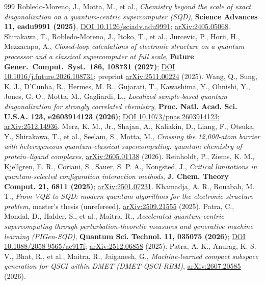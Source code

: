 \documentclass[onecolumn,a4paper]{quantumarticle}
\begin{document}
\begin{thebibliography}{999}
 Robledo-Moreno, J., Motta, M., et al., \emph{Chemistry beyond the scale of exact diagonalization on a quantum-centric supercomputer (SQD)}, \textbf{Science Advances 11, eadu9991 (2025)}, \href{https://doi.org/10.1126/sciadv.adu9991}{DOI 10.1126/sciadv.adu9991}; \href{https://arxiv.org/abs/2405.05068}{arXiv:2405.05068}.
 Shirakawa, T., Robledo-Moreno, J., Itoko, T., et al., Jurcevic, P., Horii, H., Mezzacapo, A., \emph{Closed-loop calculations of electronic structure on a quantum processor and a classical supercomputer at full scale}, \textbf{Future Gener.\ Comput.\ Syst.\ 186, 108731 (2027)}; \href{https://doi.org/10.1016/j.future.2026.108731}{DOI 10.1016/j.future.2026.108731}; preprint \href{https://arxiv.org/abs/2511.00224}{arXiv:2511.00224} (2025).
 Wang, Q., Sung, K. J., D'Cunha, R., Hermes, M. R., Gujarati, T., Kawashima, Y., Ohnishi, Y., Jones, G. O., Motta, M., Gagliardi, L., \emph{Localized sample-based quantum diagonalization for strongly correlated chemistry}, \textbf{Proc. Natl. Acad. Sci. U.S.A. 123, e2603914123 (2026)}; \href{https://doi.org/10.1073/pnas.2603914123}{DOI 10.1073/pnas.2603914123}; \href{https://arxiv.org/abs/2512.14936}{arXiv:2512.14936}.
 Merz, K. M., Jr., Shajan, A., Kaliakin, D., Liang, F., Otsuka, Y., Shirakawa, T., et al., Seelam, S., Motta, M., \emph{Crossing the 12,000-atom barrier with heterogeneous quantum-classical supercomputing: quantum chemistry of protein--ligand complexes}, \href{https://arxiv.org/abs/2605.01138}{arXiv:2605.01138} (2026).
 Reinholdt, P., Ziems, K. M., Kjellgren, E. R., Coriani, S., Sauer, S. P. A., Kongsted, J., \emph{Critical limitations in quantum-selected configuration interaction methods}, \textbf{J. Chem. Theory Comput. 21, 6811 (2025)}; \href{https://arxiv.org/abs/2501.07231}{arXiv:2501.07231}.
 Khamadja, A. R., Rouabah, M. T., \emph{From VQE to SQD: modern quantum algorithms for the electronic structure problem}, master's thesis (unrefereed), \href{https://arxiv.org/abs/2509.21555}{arXiv:2509.21555} (2025).
 Patra, C., Mondal, D., Halder, S., et al., Maitra, R., \emph{Accelerated quantum-centric supercomputing through perturbation-theoretic measures and generative machine learning (PIGen-SQD)}, \textbf{Quantum Sci. Technol. 11, 035075 (2026)}; \href{https://doi.org/10.1088/2058-9565/ae917f}{DOI 10.1088/2058-9565/ae917f}; \href{https://arxiv.org/abs/2512.06858}{arXiv:2512.06858} (2025).
 Patra, A. K., Anurag, K. S. V., Bhat, R., et al., Maitra, R., Jaiganesh, G., \emph{Machine-learned compact subspace generation for QSCI within DMET (DMET-QSCI-RBM)}, \href{https://arxiv.org/abs/2607.20585}{arXiv:2607.20585} (2026).

\end{thebibliography}
\end{document}
